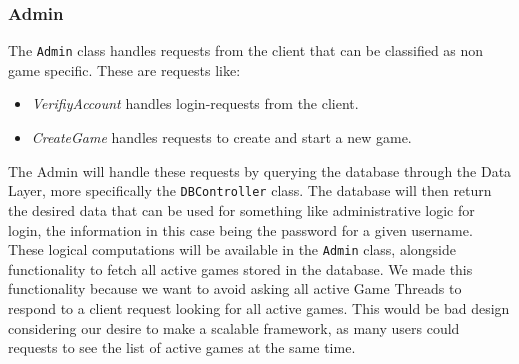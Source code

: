 \subsubsection{Admin}
\label{sec:adminimpl}
The \texttt{Admin} class handles requests from the client that can be classified as non game specific. These are requests like:
\begin{itemize}
\item \textit{VerifiyAccount} handles login-requests from the client.
\item \textit{CreateGame} handles requests to create and start a new game.
\end{itemize}

The Admin will handle these requests by querying the database through the Data Layer, more specifically the \texttt{DBController} class. The database will then return the desired data that can be used for something like administrative logic for login, the information in this case being the password for a given username. These logical computations will be available in the \texttt{Admin} class, alongside functionality to fetch all active games stored in the database. We made this functionality because we want to avoid asking all active Game Threads to respond to a client request looking for all active games. This would be bad design considering our desire to make a scalable framework, as many users could requests to see the list of active games at the same time. 



